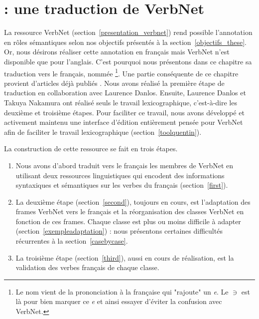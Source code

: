 \chapter{\verbenet{} : une traduction de VerbNet}
\label{ch:verbnet}

La ressource VerbNet (section~\ref{presentation_verbnet}) rend possible
l'annotation en rôles sémantiques selon nos objectifs présentés à la
section~\ref{objectifs_these}. Or, nous désirons réaliser cette annotation en
français mais VerbNet n'est disponible que pour l'anglais. C'est pourquoi nous
présentons dans ce chapitre sa traduction vers le français, nommée
\verbenet{}\footnote{Le nom vient de la prononciation à la française qui
    "rajoute" un \textit{e}. Le $\ni$ est là pour bien marquer ce \textit{e} et
ainsi essayer d'éviter la confusion avec VerbNet.}. Une partie conséquente de
ce chapitre provient d'articles déjà publiés
\citep{danlos2014vers,pradet2014adapting}. Nous avons réalisé la première étape
de traduction en collaboration avec Laurence Danlos. Ensuite, Laurence Danlos
et Takuya Nakamura ont réalisé seuls le travail lexicographique, c'est-à-dire
les deuxième et troisième étapes. Pour faciliter ce travail, nous avons
développé et activement maintenu une interface d'édition entièrement pensée
pour VerbNet afin de faciliter le travail lexicographique
(section~\ref{toolquentin}).

La construction de cette ressource se fait en trois étapes.
\begin{enumerate}
    \item Nous avons d'abord traduit vers le français les membres de VerbNet en
        utilisant deux ressources linguistiques qui encodent des informations
        syntaxiques et sémantiques sur les verbes du français
        (section~\ref{first}).
    \item La deuxième étape (section~\ref{second}), toujours en cours, est
        l'adaptation des frames VerbNet vers le français et la réorganisation
        des classes VerbNet en fonction de ces frames. Chaque classe est plus
        ou moins difficile à adapter (section~\ref{exempleadaptation}) : nous
        présentons certaines difficultés récurrentes à la
        section~\ref{casebycase}.
    \item La troisième étape (section~\ref{third}), aussi en cours de
        réalisation, est la validation des verbes français de chaque classe.
\end{enumerate}

